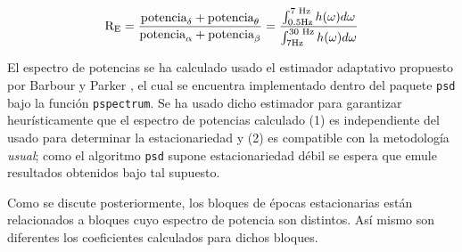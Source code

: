 \begin{equation}
\text{R}_{\text{E}} = \frac{\text{potencia}_{\delta}+\text{potencia}_{\theta}}
{\text{potencia}_{\alpha}+\text{potencia}_{\beta}} =
\frac{\int_{\text 0.5 \si{\hertz}}^{\text{7 \si{\hertz}}}h(\omega) d\omega}
{\int_{\text 7 \si{\hertz}}^{\text{30 \si{\hertz}}}h(\omega) d\omega}
\label{enlentecimiento}
\end{equation}

El espectro de potencias se ha calculado usado el estimador adaptativo propuesto por
Barbour y Parker \cite{Barbour14}, el cual se encuentra implementado dentro del paquete
\texttt{psd} bajo la función \texttt{pspectrum}.
Se ha usado dicho estimador para garantizar heurísticamente que el espectro de potencias
calculado (1) es independiente del usado para determinar la estacionariedad y (2)
es compatible con la metodología \textit{usual}; como el algoritmo \texttt{psd} 
supone estacionariedad débil se espera que emule resultados 
obtenidos bajo tal supuesto.

Como se discute posteriormente, los bloques de épocas estacionarias están relacionados a bloques
cuyo espectro de potencia son distintos. Así mismo son diferentes los coeficientes \lento calculados
para dichos bloques.

